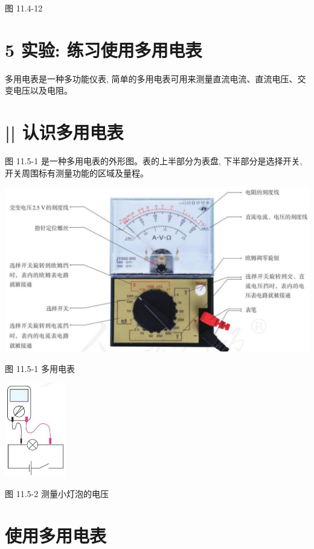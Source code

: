 \documentclass[10pt]{article}
\begin{document}
图 11.4-12

\section*{5 实验: 练习使用多用电表}

多用电表是一种多功能仪表, 简单的多用电表可用来测量直流电流、直流电压、交变电压以及电阻。

\section*{|| 认识多用电表}

图 11.5-1 是一种多用电表的外形图。表的上半部分为表盘, 下半部分是选择开关, 开关周围标有测量功能的区域及量程。

\begin{center}
\includegraphics[max width=1.0\textwidth]{images/01911d5f-8e38-70c0-b5b8-2b399bd115b6_77_727340.jpg}
\end{center}

图 11.5-1 多用电表

\begin{center}
\includegraphics[max width=0.2\textwidth]{images/01911d5f-8e38-70c0-b5b8-2b399bd115b6_77_805350.jpg}
\end{center}

图 11.5-2 测量小灯泡的电压

\section*{使用多用电表}
\end{document}
